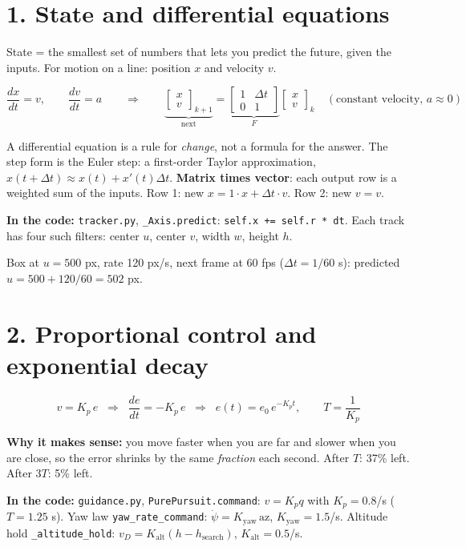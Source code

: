 \documentclass[10pt]{article}
\newcommand{\code}[1]{\textcolor{code}{\texttt{#1}}}
\newcommand{\where}[1]{\par\textbf{\textcolor{code}{In the code:}} #1}
\newcommand{\why}[1]{\par\textbf{\textcolor{idea}{Why it makes sense:}} #1}
\begin{document}
\section*{1. State and differential equations}
State = the smallest set of numbers that lets you predict the future, given the inputs.
For motion on a line: position $x$ and velocity $v$.
\begin{eqbox}
\[
\frac{dx}{dt} = v,\qquad \frac{dv}{dt} = a
\qquad\Longrightarrow\qquad
\underbrace{\begin{bmatrix} x \\ v\end{bmatrix}_{k+1}}_{\text{next}}
= \underbrace{\begin{bmatrix} 1 & \Delta t\\ 0 & 1\end{bmatrix}}_{F}
\begin{bmatrix} x \\ v\end{bmatrix}_{k}
\quad(\text{constant velocity, } a \approx 0)
\]
\end{eqbox}
A differential equation is a rule for \emph{change}, not a formula for the answer.
The step form is the Euler step: a first-order Taylor approximation, $x(t+\Delta t)\approx
x(t) + x'(t)\Delta t$. \textbf{Matrix times vector}: each output row is a weighted sum of
the inputs. Row 1: new $x = 1\cdot x + \Delta t\cdot v$. Row 2: new $v = v$.
\where{\code{tracker.py}, \code{\_Axis.predict}: \code{self.x += self.r * dt}. Each track
has four such filters: center $u$, center $v$, width $w$, height $h$.}
\begin{exbox}
Box at $u=500$ px, rate 120 px/s, next frame at 60 fps ($\Delta t = 1/60$ s):
predicted $u = 500 + 120/60 = 502$ px.
\end{exbox}

\section*{2. Proportional control and exponential decay}
\begin{eqbox}
\[
v = K_p\, e \;\;\Longrightarrow\;\; \frac{de}{dt} = -K_p\, e
\;\;\Longrightarrow\;\; e(t) = e_0\, e^{-K_p t},\qquad T = \frac{1}{K_p}
\]
\end{eqbox}
\why{you move faster when you are far and slower when you are close, so the error
shrinks by the same \emph{fraction} each second. After $T$: 37\% left. After $3T$: 5\%
left.}
\where{\code{guidance.py}, \code{PurePursuit.command}: $v = K_p q$ with $K_p = 0.8$/s
($T = 1.25$ s). Yaw law \code{yaw\_rate\_command}: $\dot\psi = K_\text{yaw}\,\text{az}$,
$K_\text{yaw} = 1.5$/s. Altitude hold \code{\_altitude\_hold}: $v_D = K_\text{alt}(h -
h_\text{search})$, $K_\text{alt} = 0.5$/s.}
\end{document}
